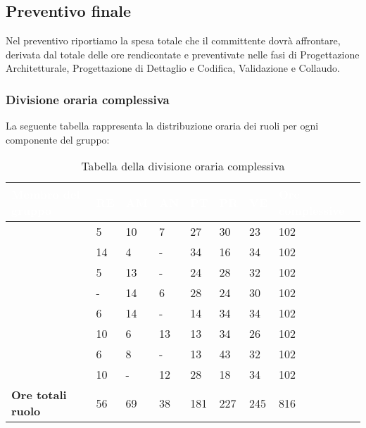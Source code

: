 \subsection{Preventivo finale} 
Nel preventivo riportiamo la spesa totale che il committente dovrà affrontare, derivata dal totale delle ore rendicontate e preventivate nelle fasi di Progettazione Architetturale, Progettazione di Dettaglio e Codifica, Validazione e Collaudo.

\subsubsection{Divisione oraria complessiva} 
La seguente tabella rappresenta la distribuzione oraria dei ruoli per ogni componente del gruppo:
{
\renewcommand{\arraystretch}{2}
\begin{longtable}[h!] { C{4cm} C{1cm} C{1cm} C{1cm} C{1cm} C{1cm} C{1cm} C{3cm}}
\caption{Tabella della divisione oraria complessiva}\\

\textcolor{white}{\textbf{Membro del gruppo}} & 
\textcolor{white}{\textbf{RE}} & 
\textcolor{white}{\textbf{AM}} & 
\textcolor{white}{\textbf{AN}} & 
\textcolor{white}{\textbf{PT}} & 
\textcolor{white}{\textbf{PR}} & 
\textcolor{white}{\textbf{VE}} & 
\textcolor{white}{\textbf{Ore complessive}}\\	
\endhead
        
\MC{}                     &  5 & 10 &  7 &  27 &  30 &  23 & 102 \\
\LD{}                     & 14 &  4 &  - &  34 &  16 &  34 & 102 \\
\CE{}                     &  5 & 13 &  - &  24 &  28 &  32 & 102 \\
\SE{}                     &  - & 14 &  6 &  28 &  24 &  30 & 102 \\
\PF{}                     &  6 & 14 &  - &  14 &  34 &  34 & 102 \\
\DF{}                     & 10 &  6 & 13 &  13 &  34 &  26 & 102 \\
\BR{}                     &  6 &  8 &  - &  13 &  43 &  32 & 102 \\
\AT{}                     & 10 &  - & 12 &  28 &  18 &  34 & 102 \\
\textbf{Ore totali ruolo} & 56 & 69 & 38 & 181 & 227 & 245 & 816 \\

\end{longtable}
}

